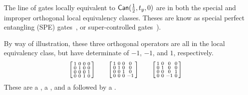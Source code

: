 The line of gates locally equivalent to ${\sf{Can}}(\tfrac{1}{2}, t_y, 0)$ are in both the special and improper orthogonal local equivalency classes.
Theses are know as special perfect entangling  (SPE) gates~\cite{Rezakhani2004a,Koponen2005a,Musz2013a}, or super-controlled gates~\cite{Ye2004a,Huang2021a}).
\begin{center}
\end{center}

By way of illustration, these three orthogonal operators are all in the  local equivalency class, but have determinate of $-1$, $-1$, and $1$, respectively.
\[
\begin{bsmallmatrix}
 1& 0 & 0 & 0 \\
  0 & 1 & 0 & 0 \\
  0 & 0 & 0 & 1 \\
  0 & 0 & 1 & 0 
\end{bsmallmatrix}
\qquad
\begin{bsmallmatrix}
 1& 0 & 0 & 0 \\
  0 & 1 & 0 & 0 \\
  0 & 0 & 1 & 0 \\
  0 & 0 & 0 & -1 
\end{bsmallmatrix}
\qquad
\begin{bsmallmatrix}
 1& 0 & 0 & 0 \\
  0 & 1 & 0 & 0 \\
  0 & 0 & 0 & 1 \\
  0 & 0 & -1 & 0 
\end{bsmallmatrix}
\notag
\]
These are a , a , and a  followed by a .






